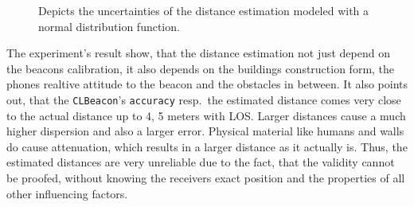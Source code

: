 \begin{figure}
\caption{Depicts the uncertainties of the distance estimation modeled with a normal distribution function.}
\label{fig:beacon_eval_ndf}
\end{figure}

The experiment's result show, that the distance estimation not just depend on the beacons calibration, it also depends on the buildings construction form, the phones realtive attitude to the beacon and the obstacles in between.
It also points out, that the \texttt{CLBeacon}'s \texttt{accuracy} resp.\ the estimated distance comes very close to the actual distance up to 4, 5 meters with \acs{LOS}.
Larger distances cause a much higher dispersion and also a larger error.
Physical material like humans and walls do cause attenuation, which results in a larger distance as it actually is.
Thus, the estimated distances are very unreliable due to the fact, that the validity cannot be proofed, without knowing the receivers exact position and the properties of all other influencing factors.


